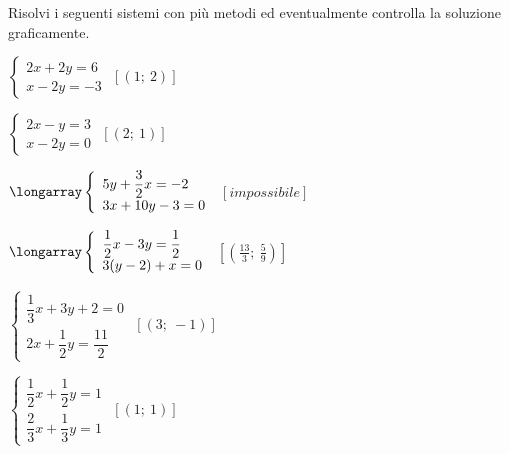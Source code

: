 \begin{esercizio}[\Ast]
 \label{ese:22.71}
 Risolvi i seguenti sistemi con più metodi ed eventualmente controlla
la soluzione graficamente.
\begin{multicols}{2}
\begin{enumeratea}
\item $\left\{\begin{array}{l}{2x+2y=6}\\{x-2y=-3}\end{array}\right.$
 \hfill $\left[(1;~2)\right]$
\item $\left\{\begin{array}{l}{2x-y=3}\\{x-2y=0}\end{array}\right.$
 \hfill $\left[(2;~1)\right]$
\item $\longarray\left\{\begin{array}{l}5y+\dfrac{3}{2}x=-2\\3x+10y-3=0 
\end{array}\right.$
 \hfill $\left[impossibile\right]$
\item 
$\longarray\left\{\begin{array}{l}\dfrac{1}{2}x-3y=\dfrac{1}{2}\\3(y-2)+x=0 
\end{array}\right.$
 \hfill $\left[\left(\frac{13}{3};~\frac{5}{9}\right)\right]$
\item 
$\left\{\begin{array}{l}{\dfrac{1}{3}x+3y+2=0}\\{2x+\dfrac{1}{2}y=\dfrac{11}{2}}
\end{array}\right.$
 \hfill $\left[(3;~-1)\right]$
\item 
$\left\{\begin{array}{l}{\dfrac{1}{2}x+\dfrac{1}{2}y=1}\\{\dfrac{2}{3}x+\dfrac{1
}{3}y=1}\end{array}\right.$
 \hfill $\left[(1;~1)\right]$
 {\longarray
\item 
}
\end{enumeratea}
\end{multicols}
\end{esercizio}
